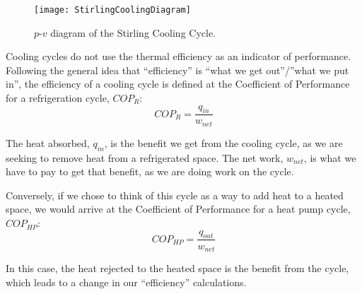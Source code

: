 \begin{figure}[H]
\centering
\texttt{[image: StirlingCoolingDiagram]}
\caption{$p$-$v$ diagram of the Stirling Cooling Cycle.}
\label{fig:ch3_StirlingCoolingCycle}
\end{figure}

Cooling cycles do not use the thermal efficiency as an indicator of performance.  Following the general idea that ``efficiency'' is ``what we get out''/''what we put in'', the efficiency of a cooling cycle is defined at the Coefficient of Performance for a refrigeration cycle, $COP_R$:
\begin{equation*}
  COP_R = \frac{q_{in}}{w_{net}}
\end{equation*}

The heat absorbed, $q_{in}$, is the benefit we get from the cooling cycle, as we are seeking to remove heat from a refrigerated space.  The net work, $w_{net}$, is what we have to pay to get that benefit, as we are doing work on the cycle.

Conversely, if we chose to think of this cycle as a way to add heat to a heated space, we would arrive at the Coefficient of Performance for a heat pump cycle, $COP_{HP}$:
\begin{equation*}
  COP_{HP} = \frac{q_{out}}{w_{net}}
\end{equation*}

In this case, the heat rejected to the heated space is the benefit from the cycle, which leads to a change in our ``efficiency'' calculations.

